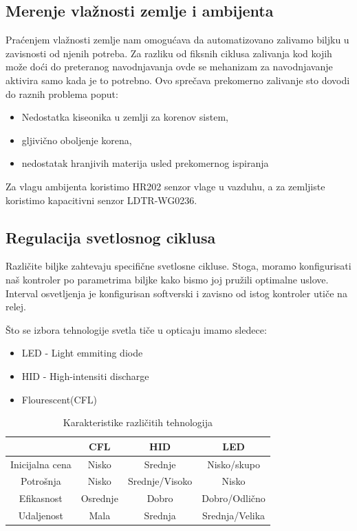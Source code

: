 \documentclass[a4paper,11pt]{book}
\begin{document}
\subsection{Merenje vlažnosti zemlje i ambijenta}
Praćenjem vlažnosti zemlje nam omogućava da automatizovano zalivamo biljku u zavisnosti od njenih potreba. Za razliku od fiksnih ciklusa zalivanja kod kojih može doći do preteranog navodnjavanja ovde se mehanizam za navodnjavanje aktivira samo kada je to potrebno. Ovo sprečava prekomerno zalivanje sto dovodi do raznih problema poput:

\begin{itemize}
  \item Nedostatka kiseonika u zemlji za korenov sistem,
  \item gljivično oboljenje korena,
  \item nedostatak hranjivih materija usled prekomernog ispiranja
\end{itemize}

Za vlagu ambijenta koristimo HR202 senzor vlage u vazduhu, a za zemljiste koristimo kapacitivni senzor LDTR-WG0236.

\subsection{Regulacija svetlosnog ciklusa}
Različite biljke zahtevaju specifične svetlosne cikluse. Stoga, moramo konfigurisati naš kontroler po parametrima biljke kako bismo joj pružili optimalne uslove. Interval osvetljenja je konfigurisan softverski i zavisno od istog kontroler utiče na relej. 

Što se izbora tehnologije svetla tiče u opticaju imamo sledece:

\begin{itemize}
  \item LED - Light emmiting diode
  \item HID - High-intensiti discharge
  \item Flourescent(CFL)
\end{itemize}

\begin{table}[ht]
  \caption{Karakteristike različitih tehnologija}
  \centering
  \begin{tabular}{|c|c|c|c|}
  \hline
   & CFL & HID & LED \\ \hline
  Inicijalna cena & Nisko & Srednje & Nisko/skupo \\ \hline
  Potrošnja & Nisko & Srednje/Visoko & Nisko \\ \hline
  Efikasnost & Osrednje & Dobro & Dobro/Odlično \\ \hline
  Udaljenost & Mala & Srednja & Srednja/Velika \\ \hline
  \end{tabular}
\end{table}
\end{document}
